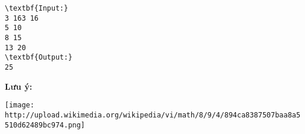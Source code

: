 \begin{verbatim}
\textbf{Input:}
3 163 16
5 10
8 15
13 20
\textbf{Output:}
25\end{verbatim}

\textbf{Lưu ý:}


\texttt{[image: http://upload.wikimedia.org/wikipedia/vi/math/8/9/4/894ca8387507baa8a5510d62489bc974.png]}
